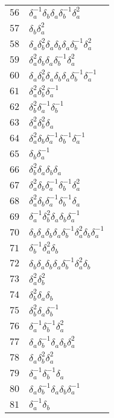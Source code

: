 \documentclass{article}
\begin{document}
\begin{center}
\begin{tabular}{ll}
$56$ & $\delta_a^{-1}\delta_b^{}\delta_a^{}\delta_b^{-1}\delta_a^{2}$ \\
$57$ & $\delta_b^{}\delta_a^{2}$ \\
$58$ & $\delta_a^{}\delta_b^{2}\delta_a^{}\delta_b^{}\delta_a^{}\delta_b^{-1}\delta_a^{2}$ \\
$59$ & $\delta_a^{2}\delta_b^{}\delta_a^{}\delta_b^{-1}\delta_a^{2}$ \\
$60$ & $\delta_a^{}\delta_b^{2}\delta_a^{}\delta_b^{}\delta_a^{}\delta_b^{-1}\delta_a^{-1}$ \\
$61$ & $\delta_a^{2}\delta_b^{2}\delta_a^{-1}$ \\
$62$ & $\delta_b^{2}\delta_a^{-1}\delta_b^{-1}$ \\
$63$ & $\delta_a^{2}\delta_b^{2}\delta_a^{}$ \\
$64$ & $\delta_a^{2}\delta_b^{}\delta_a^{-1}\delta_b^{-1}\delta_a^{-1}$ \\
$65$ & $\delta_b^{}\delta_a^{-1}$ \\
$66$ & $\delta_b^{2}\delta_a^{}\delta_b^{}\delta_a^{}$ \\
$67$ & $\delta_a^{2}\delta_b^{}\delta_a^{-1}\delta_b^{-1}\delta_a^{2}$ \\
$68$ & $\delta_a^{2}\delta_b^{}\delta_a^{-1}\delta_b^{-1}\delta_a^{}$ \\
$69$ & $\delta_a^{-1}\delta_b^{2}\delta_a^{}\delta_b^{}\delta_a^{-1}$ \\
$70$ & $\delta_b^{}\delta_a^{}\delta_b^{}\delta_a^{}\delta_b^{-1}\delta_a^{2}\delta_b^{}\delta_a^{-1}$ \\
$71$ & $\delta_b^{-1}\delta_a^{2}\delta_b^{}$ \\
$72$ & $\delta_b^{}\delta_a^{}\delta_b^{}\delta_a^{}\delta_b^{-1}\delta_a^{2}\delta_b^{}$ \\
$73$ & $\delta_a^{2}\delta_b^{2}$ \\
$74$ & $\delta_b^{2}\delta_a^{}\delta_b^{}$ \\
$75$ & $\delta_b^{2}\delta_a^{}\delta_b^{-1}$ \\
$76$ & $\delta_a^{-1}\delta_b^{-1}\delta_a^{2}$ \\
$77$ & $\delta_a^{}\delta_b^{-1}\delta_a^{}\delta_b^{}\delta_a^{2}$ \\
$78$ & $\delta_a^{}\delta_b^{2}\delta_a^{2}$ \\
$79$ & $\delta_a^{-1}\delta_b^{-1}\delta_a^{}$ \\
$80$ & $\delta_a^{}\delta_b^{-1}\delta_a^{}\delta_b^{}\delta_a^{-1}$ \\
$81$ & $\delta_a^{-1}\delta_b^{}$ \\

\end{tabular}
\end{center}
\end{document}
